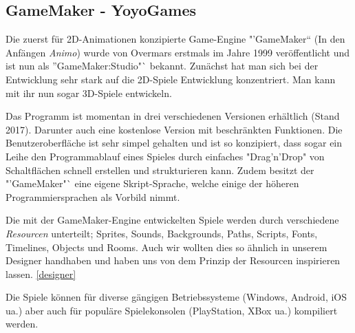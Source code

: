 \subsection{GameMaker - YoyoGames}

Die zuerst für 2D-Animationen konzipierte Game-Engine "'GameMaker"` (In den Anfängen \textit{Animo}) wurde von Overmars erstmals im Jahre 1999 veröffentlicht und ist nun als "'GameMaker:Studio"` bekannt. Zunächst hat man sich bei der Entwicklung sehr stark auf die 2D-Spiele Entwicklung konzentriert. Man kann mit ihr nun sogar 3D-Spiele entwickeln. 

Das Programm ist momentan in drei verschiedenen Versionen erhältlich (Stand 2017). Darunter auch eine kostenlose Version mit beschränkten Funktionen.
Die Benutzeroberfläche ist sehr simpel gehalten und ist so konzipiert, dass sogar ein Leihe den Programmablauf eines Spieles durch einfaches "Drag'n'Drop" von Schaltflächen schnell erstellen und strukturieren kann. Zudem besitzt der "'GameMaker"` eine eigene Skript-Sprache, welche einige der höheren Programmiersprachen als Vorbild nimmt.

Die mit der GameMaker-Engine entwickelten Spiele werden durch verschiedene \textit{Resourcen} unterteilt;
Sprites, Sounds, Backgrounds, Paths, Scripts, Fonts, Timelines, Objects und Rooms. 
Auch wir wollten dies so ähnlich in unserem Designer handhaben und haben uns von dem Prinzip der Resourcen inspirieren lassen. \ref{designer}

Die Spiele können für diverse gängigen Betriebssysteme (Windows, Android, iOS ua.) aber auch für populäre Spielekonsolen (PlayStation, XBox ua.) kompiliert werden. 
